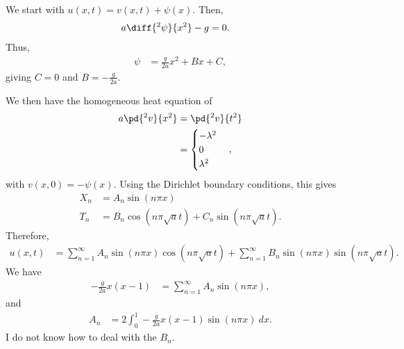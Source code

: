 \documentclass[10pt]{mypackage}
\begin{document}
\begin{solution}[12.6, Problem 10]
  We start with $u\left( x,t \right) = v\left( x,t \right) + \psi(x)$. Then,
  \begin{align*}
    a \diff{^2\psi}{x^2} -g &= 0.
  \end{align*}
  Thus,
  \begin{align*}
    \psi &= \frac{g}{2a}x^2 + Bx + C,
  \end{align*}
  giving $C = 0$ and $B = -\frac{g}{2a}$.\newline

  We then have the homogeneous heat equation of
  \begin{align*}
    a\pd{^2v}{x^2} &= \pd{^2v}{t^2}\\
                   &= \begin{cases}
                     -\lambda^2\\
                     0\\
                     \lambda^2
                   \end{cases},
  \end{align*}
  with $v\left( x,0 \right) = -\psi(x)$. Using the Dirichlet boundary conditions, this gives
  \begin{align*}
    X_n &= A_n\sin\left( n\pi x \right)\\
    T_n &= B_n\cos\left( n\pi\sqrt{a} t \right) + C_n\sin\left( n\pi\sqrt{a} t \right).
  \end{align*}
  Therefore,
  \begin{align*}
    u\left( x,t \right) &= \sum_{n=1}^{\infty}A_n\sin\left( n\pi x \right)\cos\left( n\pi\sqrt{a} t \right) + \sum_{n=1}^{\infty}B_n\sin\left( n\pi x \right)\sin\left( n\pi\sqrt{a} t \right).
  \end{align*}
  We have
  \begin{align*}
    -\frac{g}{2a}x\left( x-1 \right) &= \sum_{n=1}^{\infty}A_n\sin\left( n\pi x \right),
  \end{align*}
  and
  \begin{align*}
    A_n &= 2 \int_{0}^{1} -\frac{g}{2a}x\left( x-1 \right)\sin\left( n\pi x \right)\:dx.
  \end{align*}
  I do not know how to deal with the $B_n$.
\end{solution}
\end{document}
